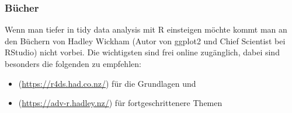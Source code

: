 \documentclass[
]{book}
\begin{document}
\hypertarget{buxfccher}{%
\subsubsection{Bücher}\label{buxfccher}}

Wenn man tiefer in tidy data analysis mit R einsteigen möchte kommt man an den Büchern von Hadley Wickham (Autor von ggplot2 und Chief Scientist bei RStudio) nicht vorbei. Die wichtigsten sind frei online zugänglich, dabei sind besonders die folgenden zu empfehlen:

\begin{itemize}
\item
  \citep[\emph{R for Data Science}][]{grolemundDataScience}(\url{https://r4ds.had.co.nz/}) für die Grundlagen und
\item
  \citep[\emph{Advanced R}][]{wickhamAdvanced2019}(\url{https://adv-r.hadley.nz/}) für fortgeschrittenere Themen
\end{itemize}

  
\end{document}
